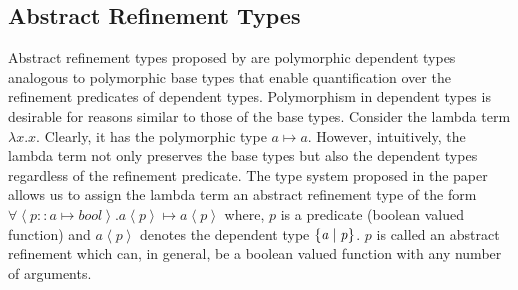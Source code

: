 \newcommand{\pr}[1]{\left< #1 \right>}
\newcommand{\lp}{\langle}
\newcommand{\rp}{\rangle}

\subsection{Abstract Refinement Types}

Abstract refinement types proposed by \cite{rjhala:ESOP13} are polymorphic dependent types analogous to polymorphic base types that enable quantification over the refinement predicates of dependent types. 
Polymorphism in dependent types is desirable for reasons similar to those of the base types. Consider the lambda term $\lambda x. x$. Clearly, it has the polymorphic 
type $a \mapsto a$. However, intuitively, the lambda term not only preserves the base types but also the dependent types regardless of the refinement predicate.
The type system proposed in the paper allows us to assign the lambda term an abstract refinement type of the form $\forall \pr{p::a \mapsto bool}. a\pr{p} \mapsto a\pr{p}$
where, $p$ is a predicate (boolean valued function) and $a\pr{p}$ denotes the dependent type $\mathit{\{ a \; | \; p\}}$. $p$ is called an abstract refinement which can, in general, be a boolean valued function with any number of arguments. 


